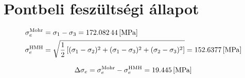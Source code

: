 \section{Pontbeli feszültségi állapot}

\begin{align*}
	\sigma_e^\text{Mohr} &= \sigma_1 - \sigma_3 = \SI{172.08244}{[\mega\pascal]}  \\
	\sigma_e^\text{HMH} &= \sqrt{\frac{1}{2}\left[(\sigma_1 - \sigma_2)^2 + (\sigma_1 - \sigma_3)^2 + (\sigma_2 - \sigma_3)^2\right]} = \SI{152.6377}{[\mega\pascal]}
\end{align*}
	
\begin{equation*}
	\Delta \sigma_e = \sigma_e^\text{Mohr} - \sigma_e^\text{HMH} = \SI{19.445}{[\mega\pascal]}
\end{equation*}
